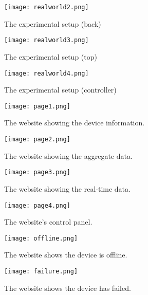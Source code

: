 \documentclass[../thesis.tex]{subfiles}
\begin{document}
\begin{figure}[!ht]
\centering
\texttt{[image: realworld2.png]}
\caption{The experimental setup (back)}
\label{fig:realworld2}
\end{figure}

\begin{figure}[!ht]
\centering
\texttt{[image: realworld3.png]}
\caption{The experimental setup (top)}
\label{fig:realworld3}
\end{figure}

\begin{figure}[!ht]
\centering
\texttt{[image: realworld4.png]}
\caption{The experimental setup (controller)}
\label{fig:realworld4}
\end{figure}

\begin{figure}[!ht]
\centering
\texttt{[image: page1.png]}
\caption{The website showing the device information.}
\label{fig:page1}
\end{figure}

\begin{figure}[!ht]
\centering
\texttt{[image: page2.png]}
\caption{The website showing the aggregate data.}
\label{fig:page2}
\end{figure}

\begin{figure}[!ht]
\centering
\texttt{[image: page3.png]}
\caption{The website showing the real-time data.}
\label{fig:page3}
\end{figure}

\begin{figure}[!ht]
\centering
\texttt{[image: page4.png]}
\caption{The website's control panel.}
\label{fig:page4}
\end{figure}

\begin{figure}[!ht]
\centering
\texttt{[image: offline.png]}
\caption{The website shows the device is offline.}
\label{fig:offline}
\end{figure}


\begin{figure}[!ht]
\centering
\texttt{[image: failure.png]}
\caption{The website shows the device has failed.}
\label{fig:failure}
\end{figure}
\end{document}
